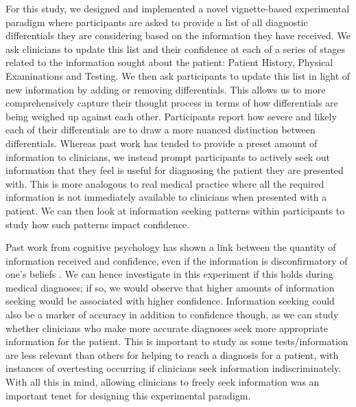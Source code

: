\documentclass[a4paper, nobind]{templates/ociamthesis}
\begin{document}
\hfill\break
For this study, we designed and implemented a novel vignette-based experimental paradigm where participants are asked to provide a list of all diagnostic differentials they are considering based on the information they have received. We ask clinicians to update this list and their confidence at each of a series of stages related to the information sought about the patient: Patient History, Physical Examinations and Testing. We then ask participants to update this list in light of new information by adding or removing differentials. This allows us to more comprehensively capture their thought process in terms of how differentials are being weighed up against each other. Participants report how severe and likely each of their differentials are to draw a more nuanced distinction between differentials. Whereas past work has tended to provide a preset amount of information to clinicians, we instead prompt participants to actively seek out information that they feel is useful for diagnosing the patient they are presented with. This is more analogous to real medical practice where all the required information is not immediately available to clinicians when presented with a patient. We can then look at information seeking patterns within participants to study how such patterns impact confidence.

\hfill\break
Past work from cognitive psychology has shown a link between the quantity of information received and confidence, even if the information is disconfirmatory of one's beliefs \autocite{ko_divergent_2022}. We can hence investigate in this experiment if this holds during medical diagnoses; if so, we would observe that higher amounts of information seeking would be associated with higher confidence. Information seeking could also be a marker of accuracy in addition to confidence though, as we can study whether clinicians who make more accurate diagnoses seek more appropriate information for the patient. This is important to study as some tests/information are less relevant than others for helping to reach a diagnosis for a patient, with instances of overtesting occurring if clinicians seek information indiscriminately. With all this in mind, allowing clinicians to freely seek information was an important tenet for designing this experimental paradigm.
\end{document}

